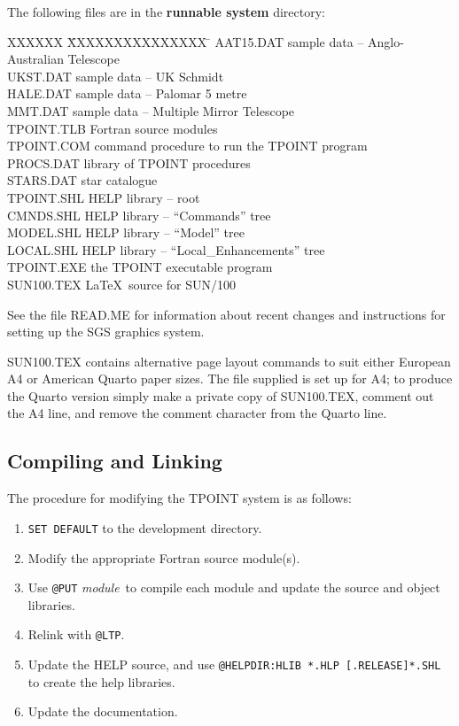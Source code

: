 \goodbreak
The following files are in the {\bf runnable system} directory:
\begin{tabs}
XXXXXX \= XXXXXXXXXXXXXXX \= \kill
\> AAT15.DAT \> sample data -- Anglo-Australian Telescope \\
\> UKST.DAT \> sample data -- UK Schmidt \\
\> HALE.DAT \> sample data -- Palomar 5 metre \\
\> MMT.DAT \> sample data -- Multiple Mirror Telescope \\
\> TPOINT.TLB \> Fortran source modules \\
\> TPOINT.COM \> command procedure to run the TPOINT program \\
\> PROCS.DAT \> library of TPOINT procedures \\
\> STARS.DAT \> star catalogue \\
\> TPOINT.SHL \> HELP library -- root \\
\> CMNDS.SHL \> HELP library -- ``Commands'' tree \\
\> MODEL.SHL \> HELP library -- ``Model'' tree \\
\> LOCAL.SHL \> HELP library -- ``Local\_Enhancements'' tree \\
\> TPOINT.EXE \> the TPOINT executable program \\
\> SUN100.TEX \> \LaTeX\ source for SUN/100
\end{tabs}

See the file READ.ME for information about recent changes and
instructions for setting up the SGS graphics system.

SUN100.TEX contains alternative page layout commands to suit
either European A4 or American Quarto paper sizes.  The file supplied
is set up for A4;  to produce the Quarto version simply make a private copy
of SUN100.TEX, comment out the A4 line, and remove the comment character
from the Quarto line.

\subsection{Compiling and Linking}
The procedure for modifying the TPOINT system is as
follows:
\begin{enumerate}
\item {\tt SET DEFAULT} to the development directory.
\item Modify the appropriate Fortran source module(s).
\item Use {\tt @PUT} {\it module}\, to compile each module
      and update the source and object libraries.
\item Relink with {\tt @LTP}.
\item Update the HELP source, and use
      {\tt @HELPDIR:HLIB *.HLP [.RELEASE]*.SHL} to
      create the help libraries.
\item Update the documentation.
\end{enumerate}

